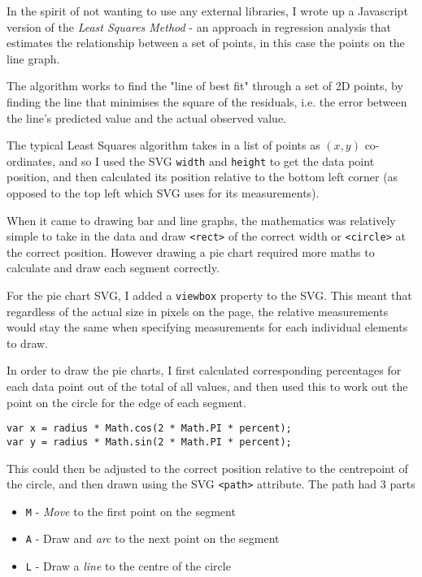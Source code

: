 \documentclass[ %
                    author={Aleena Baig},
                supervisor={Dr Simon Lock},
                    degree={BSc},
                     title={On Making Web Accessible Graphs},
                  subtitle={},
                      year={2019} ]{dissertation}
\begin{document}
In the spirit of not wanting to use any external libraries, I wrote up a Javascript version of the \textit{Least Squares Method} -  an approach in regression analysis that estimates the relationship between a set of points, in this case the points on the line graph.

The algorithm works to find the "line of best fit" through a set of 2D points, by finding the line that minimises the square of the residuals, i.e. the error between the line's predicted value and the actual observed value.

The typical Least Squares algorithm takes in a list of points as $(x,y)$ co-ordinates, and so I used the SVG \texttt{width} and \texttt{height} to get the data point position, and then calculated its position relative to the bottom left corner (as opposed to the top left which SVG uses for its measurements).

When it came to drawing bar and line graphs, the mathematics was relatively simple to take in the data and draw \texttt{<rect>} of the correct width or \texttt{<circle>} at the correct position. However drawing a pie chart required more maths to calculate and draw each segment correctly.

For the pie chart SVG, I added a \texttt{viewbox} property to the SVG. This meant that regardless of the actual size in pixels on the page, the relative measurements would stay the same when specifying measurements for each individual elements to draw.

In order to draw the pie charts, I first calculated corresponding percentages for each data point out of the total of all values, and then used this to work out the point on the circle for the edge of each segment.

\begin{lstlisting}
var x = radius * Math.cos(2 * Math.PI * percent);
var y = radius * Math.sin(2 * Math.PI * percent);
\end{lstlisting}

This could then be adjusted to the correct position relative to the centrepoint of the circle, and then drawn using the SVG \texttt{<path>} attribute. The path had 3 parts

\begin{itemize}
    \item \texttt{M} - \textit{Move} to the first point on the segment
    \item \texttt{A} - Draw and \textit{arc} to the next point on the segment
    \item \texttt{L} - Draw a \textit{line} to the centre of the circle
\end{itemize}
\end{document}
